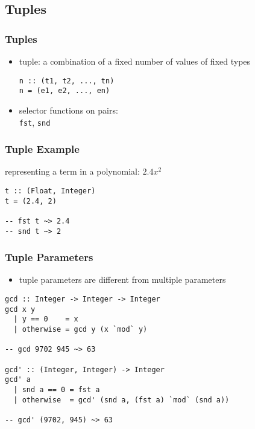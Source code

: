 \documentclass[dvipsnames]{beamer}
\theoremstyle{plain}
\begin{document}
\subsection{Tuples}

\begin{frame}[fragile]
  \frametitle{Tuples}

  \begin{itemize}
    \item \alert{tuple}: a combination of a fixed number of values
      of fixed types
      \smallskip
      \begin{lstlisting}
n :: (t1, t2, ..., tn)
n = (e1, e2, ..., en)
      \end{lstlisting}

    \medskip
    \item selector functions on pairs:\\
      \lstinline|fst|, \lstinline|snd|
  \end{itemize}
\end{frame}

\begin{frame}[fragile]
  \frametitle{Tuple Example}

  \begin{exampleblock}{representing a term in a polynomial: $2.4x^2$}
    \begin{lstlisting}
t :: (Float, Integer)
t = (2.4, 2)

-- fst t ~> 2.4
-- snd t ~> 2
    \end{lstlisting}
  \end{exampleblock}
\end{frame}

\begin{frame}[fragile]
  \frametitle{Tuple Parameters}

  \begin{itemize}
    \item tuple parameters are different from multiple parameters
  \end{itemize}

  \begin{exampleblock}{}
    \begin{lstlisting}
gcd :: Integer -> Integer -> Integer
gcd x y
  | y == 0    = x
  | otherwise = gcd y (x `mod` y)

-- gcd 9702 945 ~> 63

gcd' :: (Integer, Integer) -> Integer
gcd' a
  | snd a == 0 = fst a
  | otherwise  = gcd' (snd a, (fst a) `mod` (snd a))

-- gcd' (9702, 945) ~> 63
    \end{lstlisting}
  \end{exampleblock}
\end{frame}
\end{document}
